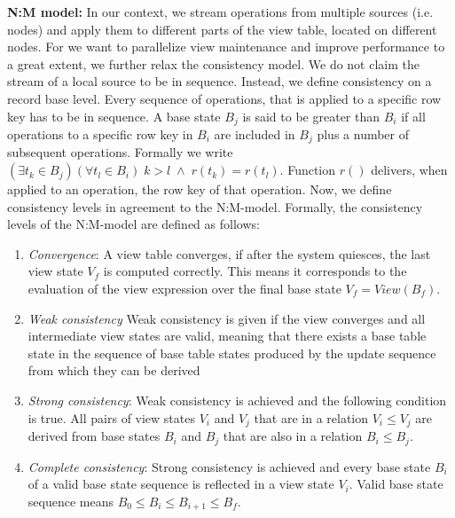 \textbf{N:M model:} In our context, we stream operations from multiple 
sources (i.e. nodes) and apply them to different parts of the view 
table, located on different nodes. For we want to parallelize view 
maintenance and improve performance to a great extent, we further relax 
the consistency model. We do not claim the stream of a local source to 
be in sequence. Instead, we define consistency on a record base level. 
Every sequence of operations, that is applied to a specific row key has 
to be in sequence. A base state $B_j$ is said to be greater than $B_i$ 
if all operations to a specific row key in $B_i$ are included in $B_j$ 
plus a number of subsequent operations. Formally we write $(\exists t_k 
\in B_j)(\forall t_l \in B_i)\;k > l\;\land\; r(t_k)=r(t_l)$. Function 
$r()$ delivers, when applied to an operation, the row key of that 
operation. Now, we define consistency levels in agreement to the 
N:M-model. Formally, the consistency levels of the N:M-model are 
defined as follows:


\begin{enumerate}
\item \textit{Convergence}: A view table converges, if after the system
  quiesces, the last view state $V_f$ is computed correctly. This
  means it corresponds to the evaluation of the view expression over
  the final base state $V_f=View(B_f)$. 

\item \textit{Weak consistency} Weak consistency is given if the view
  converges and all intermediate view states are valid, meaning that
  there exists a base table state in the sequence of base table states
  produced by the update sequence from which they can be derived

\item \textit{Strong consistency}: Weak consistency is achieved and the
  following condition is true. All pairs of view states $V_i$ and
  $V_j$ that are in a relation $V_i \leq V_j$ are derived from base
  states $B_i$ and $B_j$ that are also in a relation $B_i \leq B_j$.

\item \textit{Complete consistency}: Strong consistency is achieved
  and every base state $B_i$ of a valid base state sequence is
  reflected in a view state $V_i$. Valid base state sequence means
  $B_0 \leq B_i \leq B_{i+1}\leq B_f$.
\end{enumerate}


